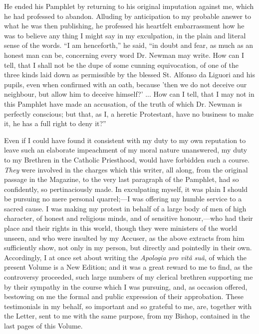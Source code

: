 He ended his Pamphlet by returning to his
original imputation against me, which he had professed to abandon.
Alluding by anticipation to my probable answer to what he was then
publishing, he professed his heartfelt embarrassment how he was to
believe any thing I might say in my exculpation, in the plain and
literal sense of the words. ``I am henceforth,'' he said, ``in doubt and
fear, as much as an honest man can be, concerning every word Dr.
Newman may write. How can I tell, that I shall not be the dupe of some
cunning equivocation, of one of the three kinds laid down as
permissible by the blessed St. Alfonso da Liguori and his pupils, even
when confirmed with an oath, because 'then we do not deceive our
neighbour, but allow him to deceive himself?' ... How can I tell, that
I may not in this Pamphlet have made an accusation, of the truth
of which Dr. Newman is perfectly conscious; but that, as I, a heretic
Protestant, have no business to make it, he has a full right to deny
it?''


Even if I could have found it consistent with my
duty to my own reputation to leave such an elaborate impeachment of my
moral nature unanswered, my duty to my Brethren in the Catholic
Priesthood, would have forbidden such a course. \emph{They} were
involved in the charges which this writer, all along, from the
original passage in the Magazine, to the very last paragraph of the
Pamphlet, had so confidently, so pertinaciously made. In exculpating
myself, it was plain I should be pursuing no mere personal
quarrel;—I was offering my humble service to a sacred cause. I was
making my protest in behalf of a large body of men of high character,
of honest and religious minds, and of sensitive honour,—who had
their place and their rights in this world, though they were ministers
of the world unseen, and who were insulted by my Accuser, as the above
extracts from him sufficiently show, not only in my person, but
directly and pointedly in their own. Accordingly, I at once set about
writing the \emph{Apologia pro vitâ suâ}, of which the present
Volume is a New Edition; and it was a great reward to me to find, as
the controversy proceeded, such large numbers of my clerical brethren
supporting me by their sympathy in the course which I was pursuing, and, as occasion offered, bestowing on me the formal and
public expression of their approbation. These testimonials in my
behalf, so important and so grateful to me, are, together with the
Letter, sent to me with the same purpose, from my Bishop, contained in
the last pages of this Volume.




